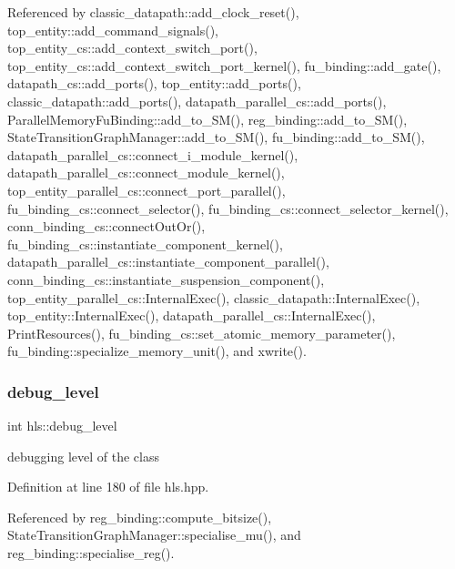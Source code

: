 Referenced by classic\+\_\+datapath\+::add\+\_\+clock\+\_\+reset(), top\+\_\+entity\+::add\+\_\+command\+\_\+signals(), top\+\_\+entity\+\_\+cs\+::add\+\_\+context\+\_\+switch\+\_\+port(), top\+\_\+entity\+\_\+cs\+::add\+\_\+context\+\_\+switch\+\_\+port\+\_\+kernel(), fu\+\_\+binding\+::add\+\_\+gate(), datapath\+\_\+cs\+::add\+\_\+ports(), top\+\_\+entity\+::add\+\_\+ports(), classic\+\_\+datapath\+::add\+\_\+ports(), datapath\+\_\+parallel\+\_\+cs\+::add\+\_\+ports(), Parallel\+Memory\+Fu\+Binding\+::add\+\_\+to\+\_\+\+S\+M(), reg\+\_\+binding\+::add\+\_\+to\+\_\+\+S\+M(), State\+Transition\+Graph\+Manager\+::add\+\_\+to\+\_\+\+S\+M(), fu\+\_\+binding\+::add\+\_\+to\+\_\+\+S\+M(), datapath\+\_\+parallel\+\_\+cs\+::connect\+\_\+i\+\_\+module\+\_\+kernel(), datapath\+\_\+parallel\+\_\+cs\+::connect\+\_\+module\+\_\+kernel(), top\+\_\+entity\+\_\+parallel\+\_\+cs\+::connect\+\_\+port\+\_\+parallel(), fu\+\_\+binding\+\_\+cs\+::connect\+\_\+selector(), fu\+\_\+binding\+\_\+cs\+::connect\+\_\+selector\+\_\+kernel(), conn\+\_\+binding\+\_\+cs\+::connect\+Out\+Or(), fu\+\_\+binding\+\_\+cs\+::instantiate\+\_\+component\+\_\+kernel(), datapath\+\_\+parallel\+\_\+cs\+::instantiate\+\_\+component\+\_\+parallel(), conn\+\_\+binding\+\_\+cs\+::instantiate\+\_\+suspension\+\_\+component(), top\+\_\+entity\+\_\+parallel\+\_\+cs\+::\+Internal\+Exec(), classic\+\_\+datapath\+::\+Internal\+Exec(), top\+\_\+entity\+::\+Internal\+Exec(), datapath\+\_\+parallel\+\_\+cs\+::\+Internal\+Exec(), Print\+Resources(), fu\+\_\+binding\+\_\+cs\+::set\+\_\+atomic\+\_\+memory\+\_\+parameter(), fu\+\_\+binding\+::specialize\+\_\+memory\+\_\+unit(), and xwrite().

\mbox{\label{classhls_a1d9555199b62e7dea9e1c9b2e69d7181}} 
\subsubsection{\texorpdfstring{debug\+\_\+level}{debug\_level}}
{\footnotesize\ttfamily int hls\+::debug\+\_\+level}



debugging level of the class 



Definition at line 180 of file hls.\+hpp.



Referenced by reg\+\_\+binding\+::compute\+\_\+bitsize(), State\+Transition\+Graph\+Manager\+::specialise\+\_\+mu(), and reg\+\_\+binding\+::specialise\+\_\+reg().

